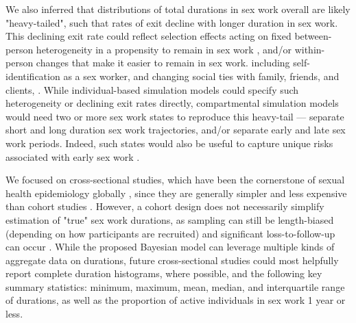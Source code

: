 We also inferred that distributions of total durations in sex work overall
are likely "heavy-tailed", such that
rates of exit decline with longer duration in sex work.
This declining exit rate could reflect
selection effects acting on fixed between-person heterogeneity in
a propensity to remain in sex work \cite{Balan2020},
and/or within-person changes that make it easier to remain in sex work.
including self-identification as a sex worker, and
changing social ties with family, friends, and clients,
\cite{Neufeld2023,Bhattacharjee2023,Ingabire2012,Bowen2011,Lora2025}.
While individual-based simulation models could specify
such heterogeneity or declining exit rates directly,
compartmental simulation models would need
two or more sex work states to reproduce this heavy-tail --- \eg
separate short and long duration sex work trajectories, and/or
separate early and late sex work periods.
Indeed, such states would also be useful to capture
unique risks associated with early sex work
\cite{Neufeld2023,Bhattacharjee2023}.
\par %
We focused on cross-sectional studies,
which have been the cornerstone of sexual health epidemiology globally \cite{WHO2017bbs,DHS},
since they are generally simpler and less expensive than cohort studies \cite{Fazito2012}.
However, a cohort design
does not necessarily simplify estimation of "true" sex work durations,
as sampling can still be length-biased
(depending on how participants are recruited)
and significant loss-to-follow-up can occur \cite{Ward2006}.
While the proposed Bayesian model can leverage
multiple kinds of aggregate data on durations,
future cross-sectional studies could most helpfully report
complete duration histograms, where possible,
and the following key summary statistics:
minimum, maximum, mean, median, and interquartile range of durations,
as well as the proportion of active individuals in sex work 1 year or less.
